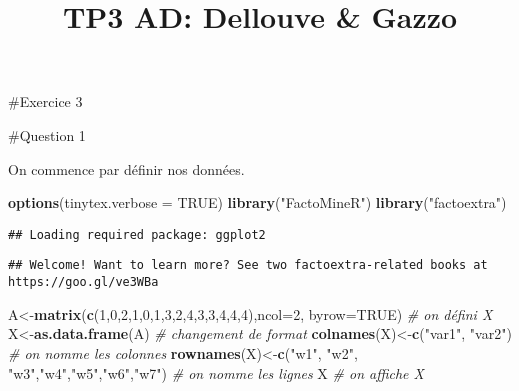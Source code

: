 \documentclass[
]{article}
\title{TP3 AD: Dellouve \& Gazzo}
\author{}
\date{\vspace{-2.5em}}
\newenvironment{Shaded}{\begin{snugshade}}{\end{snugshade}}
\newcommand{\CommentTok}[1]{\textcolor[rgb]{0.56,0.35,0.01}{\textit{#1}}}
\newcommand{\DataTypeTok}[1]{\textcolor[rgb]{0.13,0.29,0.53}{#1}}
\newcommand{\DecValTok}[1]{\textcolor[rgb]{0.00,0.00,0.81}{#1}}
\newcommand{\KeywordTok}[1]{\textcolor[rgb]{0.13,0.29,0.53}{\textbf{#1}}}
\newcommand{\NormalTok}[1]{#1}
\newcommand{\OtherTok}[1]{\textcolor[rgb]{0.56,0.35,0.01}{#1}}
\newcommand{\StringTok}[1]{\textcolor[rgb]{0.31,0.60,0.02}{#1}}
\begin{document}
\maketitle

\#Exercice 3

\#Question 1

On commence par définir nos données.

\begin{Shaded}
\begin{Highlighting}[]
\KeywordTok{options}\NormalTok{(}\DataTypeTok{tinytex.verbose =} \OtherTok{TRUE}\NormalTok{)}
\KeywordTok{library}\NormalTok{(}\StringTok{"FactoMineR"}\NormalTok{)}
\KeywordTok{library}\NormalTok{(}\StringTok{"factoextra"}\NormalTok{)}
\end{Highlighting}
\end{Shaded}

\begin{verbatim}
## Loading required package: ggplot2
\end{verbatim}

\begin{verbatim}
## Welcome! Want to learn more? See two factoextra-related books at https://goo.gl/ve3WBa
\end{verbatim}

\begin{Shaded}
\begin{Highlighting}[]
\NormalTok{A<-}\KeywordTok{matrix}\NormalTok{(}\KeywordTok{c}\NormalTok{(}\DecValTok{1}\NormalTok{,}\DecValTok{0}\NormalTok{,}\DecValTok{2}\NormalTok{,}\DecValTok{1}\NormalTok{,}\DecValTok{0}\NormalTok{,}\DecValTok{1}\NormalTok{,}\DecValTok{3}\NormalTok{,}\DecValTok{2}\NormalTok{,}\DecValTok{4}\NormalTok{,}\DecValTok{3}\NormalTok{,}\DecValTok{3}\NormalTok{,}\DecValTok{4}\NormalTok{,}\DecValTok{4}\NormalTok{,}\DecValTok{4}\NormalTok{),}\DataTypeTok{ncol=}\DecValTok{2}\NormalTok{, }\DataTypeTok{byrow=}\OtherTok{TRUE}\NormalTok{) }\CommentTok{# on défini X}
\NormalTok{X<-}\KeywordTok{as.data.frame}\NormalTok{(A) }\CommentTok{# changement de format}
\KeywordTok{colnames}\NormalTok{(X)<-}\KeywordTok{c}\NormalTok{(}\StringTok{"var1"}\NormalTok{, }\StringTok{"var2"}\NormalTok{) }\CommentTok{# on nomme les colonnes}
\KeywordTok{rownames}\NormalTok{(X)<-}\KeywordTok{c}\NormalTok{(}\StringTok{"w1"}\NormalTok{, }\StringTok{"w2"}\NormalTok{, }\StringTok{"w3"}\NormalTok{,}\StringTok{"w4"}\NormalTok{,}\StringTok{"w5"}\NormalTok{,}\StringTok{"w6"}\NormalTok{,}\StringTok{"w7"}\NormalTok{) }\CommentTok{# on nomme les lignes}
\NormalTok{X }\CommentTok{# on affiche X}
\end{Highlighting}
\end{Shaded}
\end{document}

